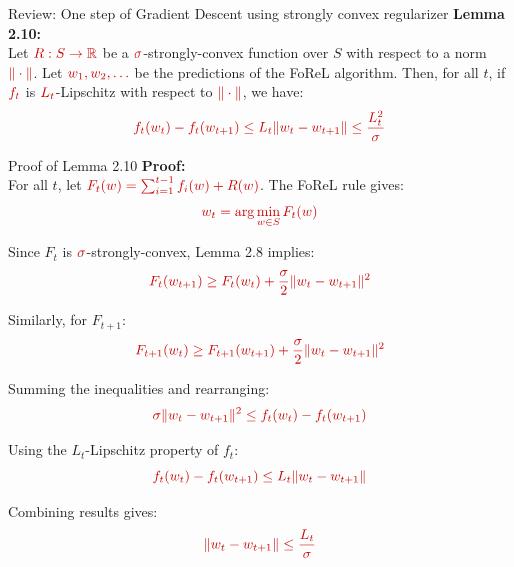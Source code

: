 \documentclass{beamer}
\newcommand{\mathred}[1]{\textcolor{mathred}{#1}}
\begin{document}
\begin{small}
\begin{frame}{Review: One step of Gradient Descent using strongly convex regularizer}
\textbf{Lemma 2.10:}\\
Let $\mathred{R : S \to \mathbb{R}}$ be a $\mathred{\sigma}$-strongly-convex function over $S$ with respect to a norm $\mathred{\|\cdot\|}$. Let $\mathred{w_1, w_2, \dots}$ be the predictions of the FoReL algorithm. Then, for all $t$, if $\mathred{f_t}$ is $\mathred{L_t}$-Lipschitz with respect to $\mathred{\|\cdot\|}$, we have:
\begin{equation*}
\mathred{f_t(w_t) - f_t(w_{t+1}) \leq L_t \|w_t - w_{t+1}\| \leq \frac{L_t^2}{\sigma}}
\end{equation*}
\end{frame}

\iffalse
\begin{frame}{Proof of Lemma 2.10}
\textbf{Proof:}\\
For all $t$, let $\mathred{F_t(w) = \sum_{i=1}^{t-1} f_i(w) + R(w)}$. The FoReL rule gives:
\begin{equation*}
\mathred{w_t = \arg\min_{w \in S} F_t(w)}
\end{equation*}

Since $F_t$ is $\mathred{\sigma}$-strongly-convex, Lemma 2.8 implies:
\begin{equation*}
\mathred{F_t(w_{t+1}) \geq F_t(w_t) + \frac{\sigma}{2}\|w_t - w_{t+1}\|^2}
\end{equation*}

Similarly, for $F_{t+1}$:
\begin{equation*}
\mathred{F_{t+1}(w_t) \geq F_{t+1}(w_{t+1}) + \frac{\sigma}{2}\|w_t - w_{t+1}\|^2}
\end{equation*}
\end{frame}

\begin{frame}
Summing the inequalities and rearranging:
\begin{equation*}
\mathred{\sigma \|w_t - w_{t+1}\|^2 \leq f_t(w_t) - f_t(w_{t+1})}
\end{equation*}

Using the $L_t$-Lipschitz property of $f_t$:
\begin{equation*}
\mathred{f_t(w_t) - f_t(w_{t+1}) \leq L_t \|w_t - w_{t+1}\|}
\end{equation*}

Combining results gives:
\begin{equation*}
\mathred{\|w_t - w_{t+1}\| \leq \frac{L_t}{\sigma}}
\end{equation*}


\end{frame}
\end{small}
\end{document}
